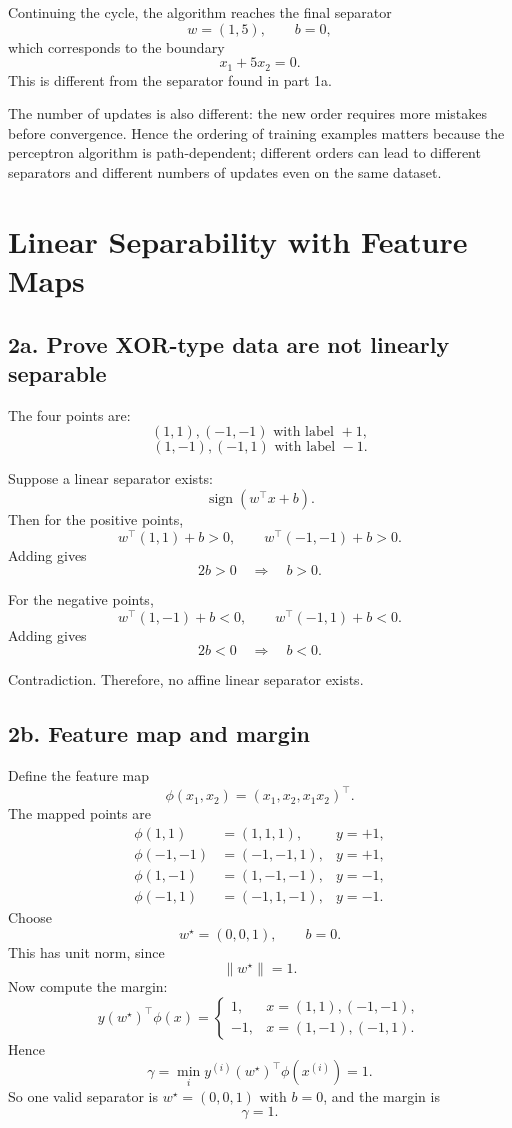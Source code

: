 \documentclass[11pt]{article}
\begin{document}
Continuing the cycle, the algorithm reaches the final separator
\[
w=(1,5),\qquad b=0,
\]
which corresponds to the boundary
\[
x_1+5x_2=0.
\]
This is different from the separator found in part 1a.

The number of updates is also different: the new order requires more mistakes before convergence. Hence the ordering of training examples matters because the perceptron algorithm is path-dependent; different orders can lead to different separators and different numbers of updates even on the same dataset.

\section{Linear Separability with Feature Maps}

\subsection*{2a. Prove XOR-type data are not linearly separable}

The four points are:
\[
(1,1), ( -1,-1) \text{ with label } +1,
\]
\[
(1,-1), (-1,1) \text{ with label } -1.
\]

Suppose a linear separator exists:
\[
\operatorname{sign}(w^\top x+b).
\]
Then for the positive points,
\[
w^\top(1,1)+b>0,
\qquad
w^\top(-1,-1)+b>0.
\]
Adding gives
\[
2b>0\quad\Longrightarrow\quad b>0.
\]

For the negative points,
\[
w^\top(1,-1)+b<0,
\qquad
w^\top(-1,1)+b<0.
\]
Adding gives
\[
2b<0\quad\Longrightarrow\quad b<0.
\]

Contradiction. Therefore, no affine linear separator exists.

\subsection*{2b. Feature map and margin}

Define the feature map
\[
\phi(x_1,x_2) = (x_1, x_2, x_1x_2)^\top.
\]
The mapped points are
\[
\begin{aligned}
\phi(1,1)&=(1,1,1),& y=+1,\\
\phi(-1,-1)&=(-1,-1,1),& y=+1,\\
\phi(1,-1)&=(1,-1,-1),& y=-1,\\
\phi(-1,1)&=(-1,1,-1),& y=-1.
\end{aligned}
\]
Choose
\[
w^\star=(0,0,1),\qquad b=0.
\]
This has unit norm, since
\[
\|w^\star\| = 1.
\]
Now compute the margin:
\[

y(w^\star)^\top \phi(x)
=
\begin{cases}
1,& x=(1,1),(-1,-1),\\
-1,& x=(1,-1),(-1,1).
\end{cases}
\]
Hence
\[
\gamma = \min_i y^{(i)}(w^\star)^\top \phi(x^{(i)}) = 1.
\]
So one valid separator is $w^\star=(0,0,1)$ with $b=0$, and the margin is
\[
\boxed{\gamma=1.}
\]
\end{document}
